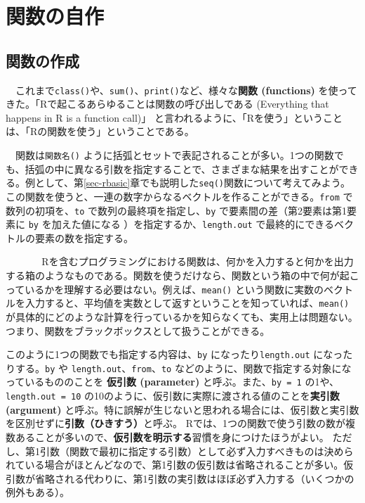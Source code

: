 \documentclass[
  a4paper,
  pandoc,
  ja=standard,
  jafont=haranoaji]{bxjsbook}
\begin{document}
\hypertarget{sec-functions}{%
\chapter{関数の自作}\label{sec-functions}}

\hypertarget{sec-func_intro}{%
\section{関数の作成}\label{sec-func_intro}}

　これまで\texttt{class()}や、\texttt{sum()}、\texttt{print()}など、様々な\textbf{関数
(functions)} を使ってきた。「Rで起こるあらゆることは関数の呼び出しである
(Everything that happens in R is a function call)」\citep{Chambers:2016}
と言われるように、「Rを使う」ということは、「Rの関数を使う」ということである。

　関数は\texttt{関数名()}
ように括弧とセットで表記されることが多い。1つの関数でも、括弧の中に異なる引数を指定することで、さまざまな結果を出すことができる。例として、第\ref{sec-rbasic}章でも説明した\texttt{seq()}関数について考えてみよう。この関数を使うと、一連の数字からなるベクトルを作ることができる。\texttt{from}
で数列の初項を、\texttt{to} で数列の最終項を指定し、\texttt{by}
で要素間の差（第2要素は第1要素に \texttt{by} を加えた値になる
）を指定するか、\texttt{length.out}
で最終的にできるベクトルの要素の数を指定する。

　 　
　Rを含むプログラミングにおける関数は、何かを入力すると何かを出力する箱のようなものである。関数を使うだけなら、関数という箱の中で何が起こっているかを理解する必要はない。例えば、\texttt{mean()}
という関数に実数のベクトルを入力すると、平均値を実数として返すということを知っていれば、\texttt{mean()}
が具体的にどのような計算を行っているかを知らなくても、実用上は問題ない。つまり、関数をブラックボックスとして扱うことができる。

このように1つの関数でも指定する内容は、\texttt{by}
になったり\texttt{length.out} になったりする。\texttt{by} や
\texttt{length.out}、\texttt{from}、\texttt{to}
などのように、関数で指定する対象になっているもののことを \textbf{仮引数
(parameter)} と呼ぶ。また、\texttt{by\ =\ 1}
の1や、\texttt{length.out\ =\ 10}
の10のように、仮引数に実際に渡される値のことを\textbf{実引数 (argument)}
と呼ぶ。特に誤解が生じないと思われる場合には、仮引数と実引数を区別せずに\textbf{引数（ひきすう）}と呼ぶ。
Rでは、1つの関数で使う引数の数が複数あることが多いので、\textbf{仮引数を明示する}習慣を身につけたほうがよい。
ただし、第1引数（関数で最初に指定する引数）として必ず入力すべきものは決められている場合がほとんどなので、第1引数の仮引数は省略されることが多い。仮引数が省略される代わりに、第1引数の実引数はほぼ必ず入力する（いくつかの例外もある）。
\end{document}
